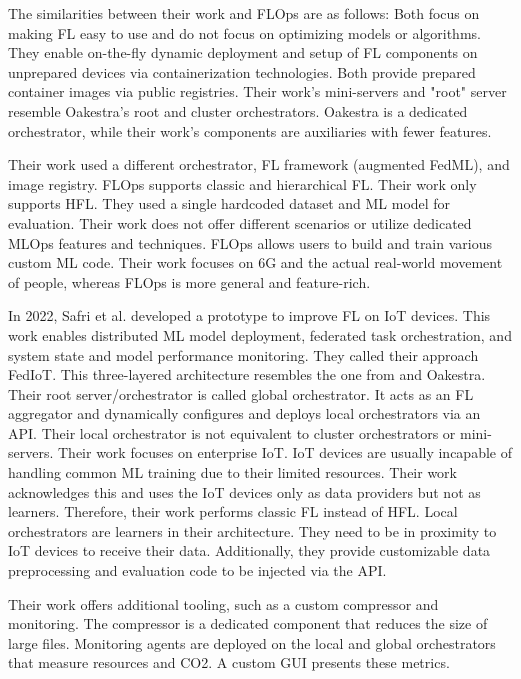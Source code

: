 The similarities between their work and FLOps are as follows:
Both focus on making FL easy to use and do not focus on optimizing models or algorithms.
They enable on-the-fly dynamic deployment and setup of FL components on unprepared devices via containerization technologies.
Both provide prepared container images via public registries.
Their work's mini-servers and "root" server resemble Oakestra's root and cluster orchestrators.
Oakestra is a dedicated orchestrator, while their work's components are auxiliaries with fewer features.

Their work used a different orchestrator, FL framework (augmented FedML), and image registry.
FLOps supports classic and hierarchical FL.
Their work only supports HFL.
They used a single hardcoded dataset and ML model for evaluation.
Their work does not offer different scenarios or utilize dedicated MLOps features and techniques.
FLOps allows users to build and train various custom ML code.
Their work focuses on 6G and the actual real-world movement of people, whereas FLOps is more general and feature-rich.


In 2022, Safri et al. \cite{paper:global_fl_platform_for_iot} developed a prototype to improve FL on IoT devices.
This work enables distributed ML model deployment, federated task orchestration, and system state and model performance monitoring.
They called their approach FedIoT.
This three-layered architecture resembles the one from \cite{paper:fl_toward_on_demand_client_deployment_at_edge} and Oakestra.
Their root server/orchestrator is called global orchestrator.
It acts as an FL aggregator and dynamically configures and deploys local orchestrators via an API.
Their local orchestrator is not equivalent to cluster orchestrators or mini-servers.
Their work focuses on enterprise IoT.
IoT devices are usually incapable of handling common ML training due to their limited resources.
Their work acknowledges this and uses the IoT devices only as data providers but not as learners.
Therefore, their work performs classic FL instead of HFL.
Local orchestrators are learners in their architecture.
They need to be in proximity to IoT devices to receive their data.
Additionally, they provide customizable data preprocessing and evaluation code to be injected via the API.

Their work offers additional tooling, such as a custom compressor and monitoring.
The compressor is a dedicated component that reduces the size of large files.
Monitoring agents are deployed on the local and global orchestrators that measure resources and CO2.
A custom GUI presents these metrics.

